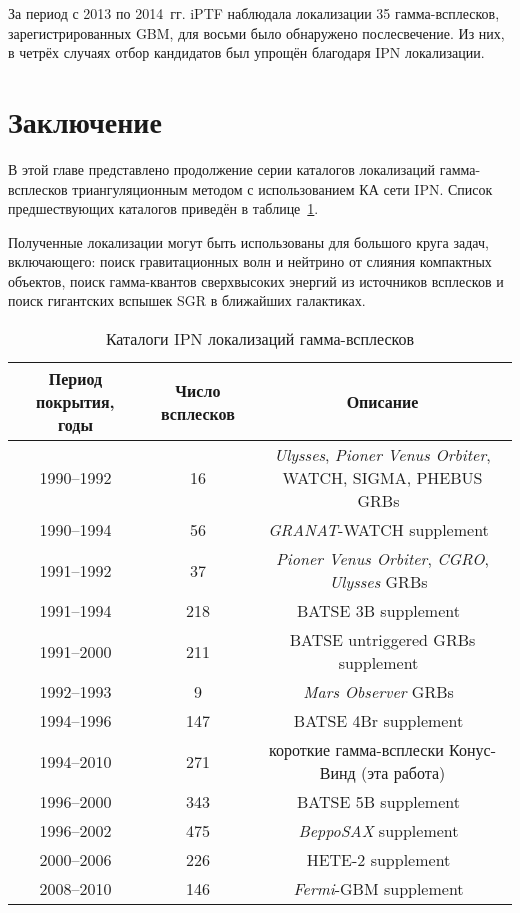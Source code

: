 За период с 2013 по 2014~гг. iPTF наблюдала локализации 35 гамма-всплесков, зарегистрированных GBM,
для восьми было обнаружено послесвечение. Из них, в четрёх случаях отбор кандидатов
был упрощён благодаря IPN локализации.


\section{Заключение}
В этой главе представлено продолжение серии каталогов локализаций гамма-всплесков 
триангуляционным методом с использованием КА сети IPN. Список предшествующих каталогов 
приведён в таблице~\ref{tab:IPN_cat}.

Полученные локализации могут быть использованы для большого круга задач, включающего: 
поиск гравитационных волн и нейтрино от слияния компактных объектов, 
поиск гамма-квантов сверхвысоких энергий из источников всплесков и поиск гигантских 
вспышек SGR в ближайших галактиках.

\begin{table} [h]
 \centering
 \caption{Каталоги IPN локализаций гамма-всплесков}\label{tab:IPN_cat}
\scriptsize
  \begin{center}
  \begin{tabular}{ccc}
  \hline
  \hline
  Период покрытия, годы & Число всплесков & Описание \\
  \hline
1990--1992 &16 &\textit{Ulysses}, \textit{Pioner Venus Orbiter}, WATCH, SIGMA, PHEBUS GRBs~\citep{Hurley_2000ApJ} \\
1990--1994 &56 &\textit{GRANAT}-WATCH supplement~\citep{Hurley_2000ApJS_WATCH} \\
1991--1992 &37 &\textit{Pioner Venus Orbiter}, \textit{CGRO}, \textit{Ulysses} GRBs~\citep{Laros_1998ApJS}\\
1991--1994 &218 &BATSE 3B supplement~\citep{Hurley_1999ApJSa}\\
1991--2000 &211 &BATSE untriggered GRBs supplement~\citep{Hurley_2005ApJS_BATSE_untrig}\\
1992--1993 &9 &\textit{Mars Observer} GRBs~\citep{Laros_1997ApJS}\\
1994--1996 &147 &BATSE 4Br supplement~\citep{Hurley_1999ApJS_BATSE_4Br}\\
1994--2010 &271 &короткие гамма-всплески Конус-Винд (эта работа)\\
1996--2000 &343 &BATSE 5B supplement~\citep{Hurley_2011ApJS_BATSE_5B}\\
1996--2002 &475 &\textit{BeppoSAX} supplement~\citep{Hurley_2010ApJS_BeppoSAX}\\
2000--2006 &226 &HETE-2 supplement~\citep{Hurley_2011ApJS_HETE2}\\
2008--2010 &146 &\textit{Fermi}-GBM supplement~\citep{Hurley_2013ApJS_GBM}\\
  \hline
  \hline
  \end{tabular}
  \end{center}
\end{table}

